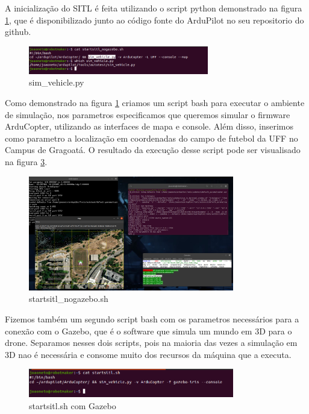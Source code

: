 \documentclass[12pt,a4paper,oneside]{book}
\begin{document}
A inicialização do SITL é feita utilizando o script python demonstrado na figura \ref{fig:sim_vehicle.png.0}, que é disponibilizado junto ao código fonte do ArduPilot no seu repositorio do github.

%
\begin{figure}[H]
  \centering
  \includegraphics[width=0.7\textwidth]{Images/Desenvolvimento/sim_vehicle.png}
  \caption{sim\_vehicle.py}
  \label{fig:sim_vehicle.png.0}
\end{figure}
%

Como demonstrado na figura \ref{fig:sim_vehicle.png.0} criamos um script bash para executar o ambiente de simulação, nos parametros especificamos que queremos simular o firmware ArduCopter, utilizando as interfaces de mapa e console. Além disso, inserimos como parametro a localização em coordenadas do campo de futebol da UFF no Campus de Gragoatá. O resultado da execução desse script pode ser visualisado na figura \ref{fig:startsitl_nogazebo.png.0}.

%
\begin{figure}[H]
  \centering
  \includegraphics[width=0.8\textwidth]{Images/Desenvolvimento/startsitl_nogazebo.png}
  \caption{startsitl\_nogazebo.sh}
  \label{fig:startsitl_nogazebo.png.0}
\end{figure}
%

Fizemos também um segundo script bash com os parametros necessários para a conexão com o Gazebo, que é o software que simula um mundo em 3D para o drone. Separamos nesses dois scripts, pois na maioria das vezes a simulação em 3D nao é necessária e consome muito dos recursos da máquina que a executa.

%
\begin{figure}[H]
  \centering
  \includegraphics[width=0.8\textwidth]{Images/Desenvolvimento/startsitl.sh.png}
  \caption{startsitl.sh com Gazebo}
  \label{fig:startsitl_nogazebo.png.0}
\end{figure}
%
\end{document}
